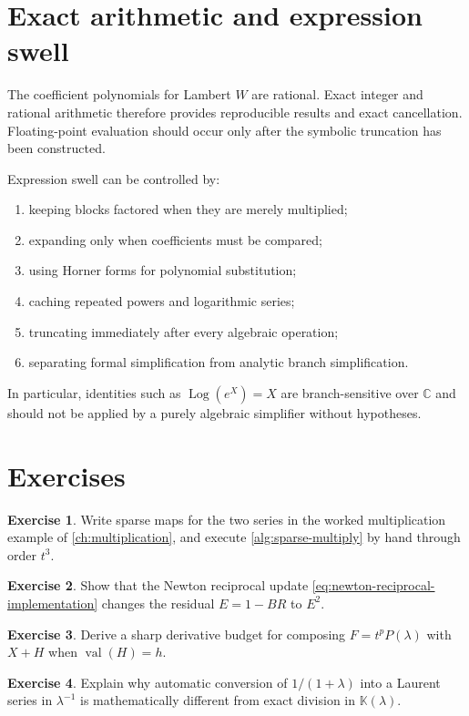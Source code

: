 \documentclass[11pt,openany]{book}
\theoremstyle{definition}
\newtheorem{exercise}{Exercise}[chapter]
\theoremstyle{plain}
\theoremstyle{remark}
\newcommand{\C}{\mathbb{C}}
\newcommand{\K}{\mathbb{K}}
\DeclareMathOperator{\val}{val}
\DeclareMathOperator{\Log}{Log}
\begin{document}
\section{Exact arithmetic and expression swell}
The coefficient polynomials for Lambert \(W\) are rational. Exact integer and rational arithmetic therefore provides reproducible results and exact cancellation. Floating-point evaluation should occur only after the symbolic truncation has been constructed.

Expression swell can be controlled by:
\begin{enumerate}
\item keeping blocks factored when they are merely multiplied;
\item expanding only when coefficients must be compared;
\item using Horner forms for polynomial substitution;
\item caching repeated powers and logarithmic series;
\item truncating immediately after every algebraic operation;
\item separating formal simplification from analytic branch simplification.
\end{enumerate}
In particular, identities such as \(\Log(e^X)=X\) are branch-sensitive over \(\C\) and should not be applied by a purely algebraic simplifier without hypotheses.

\section{Exercises}
\begin{exercise}
Write sparse maps for the two series in the worked multiplication example of \cref{ch:multiplication}, and execute \cref{alg:sparse-multiply} by hand through order \(t^3\).
\end{exercise}
\begin{exercise}
Show that the Newton reciprocal update \cref{eq:newton-reciprocal-implementation} changes the residual \(E=1-BR\) to \(E^2\).
\end{exercise}
\begin{exercise}
Derive a sharp derivative budget for composing \(F=t^pP(\lambda)\) with \(X+H\) when \(\val(H)=h\).
\end{exercise}
\begin{exercise}
Explain why automatic conversion of \(1/(1+\lambda)\) into a Laurent series in \(\lambda^{-1}\) is mathematically different from exact division in \(\K(\lambda)\).
\end{exercise}
\end{document}
